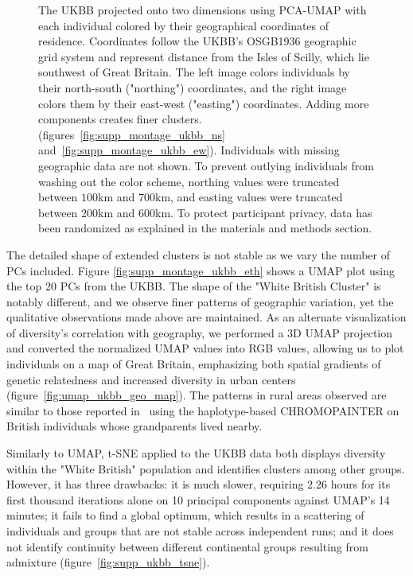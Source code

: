 \documentclass[12pt]{pnas-new}
\begin{document}
\begin{figure}
    \caption{The UKBB projected onto two dimensions using PCA-UMAP with each individual colored by their geographical coordinates of residence. Coordinates follow the UKBB's OSGB1936 geographic grid system and represent distance from the Isles of Scilly, which lie southwest of Great Britain. The left image colors individuals by their north-south ("northing") coordinates, and the right image colors them by their east-west ("easting") coordinates. Adding more components creates finer clusters.  (figures~\ref{fig:supp_montage_ukbb_ns} and~\ref{fig:supp_montage_ukbb_ew}). Individuals with missing geographic data are not shown. To prevent outlying individuals from washing out the color scheme, northing values were truncated between $100$km and $700$km, and easting values were truncated between $200$km and $600$km. To protect participant privacy, data has been randomized as explained in the materials and methods section.}
    \label{fig:umap_ukbb_geo_osgb}
\end{figure}

The detailed shape of extended clusters is not stable as we vary the number of PCs included. Figure \ref{fig:supp_montage_ukbb_eth} shows a UMAP plot using the top 20 PCs from the UKBB. The shape of the "White British Cluster" is notably different, and we observe finer patterns of geographic variation, yet the qualitative observations made above are maintained. As an alternate visualization of diversity's correlation with geography, we performed a 3D UMAP projection and converted the normalized UMAP values into RGB values, allowing us to plot individuals on a map of Great Britain, emphasizing both spatial gradients of genetic relatedness and increased diversity in urban centers (figure~\ref{fig:umap_ukbb_geo_map}). The patterns in rural areas observed are similar to those reported in~\cite{leslie2015fine} using the haplotype-based CHROMOPAINTER on British individuals whose grandparents lived nearby.  

Similarly to UMAP, t-SNE applied to the UKBB data both displays diversity within the "White British" population and identifies clusters among other groups. However, it has three drawbacks: it is much slower, requiring 2.26 hours for its first thousand iterations alone on 10 principal components against UMAP's 14 minutes; it fails to find a global optimum, which results in a scattering of individuals and groups that are not stable across independent runs; and it does not identify continuity between different continental groups resulting from admixture (figure~\ref{fig:supp_ukbb_tsne}).     
\end{document}
